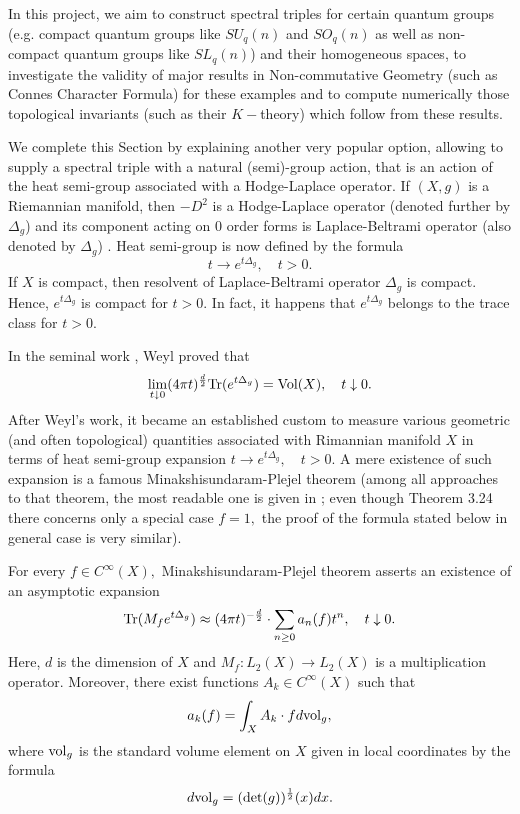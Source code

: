\documentclass{article}
\begin{document}
In this project, we aim to construct spectral triples for certain quantum groups (e.g. compact quantum groups like $SU_q(n)$ and $SO_q(n)$ as well as non-compact quantum groups like $SL_q(n)$) and their homogeneous spaces, to investigate the validity of major results in Non-commutative Geometry (such as Connes Character Formula) for these examples and to compute numerically those topological invariants (such as their $K-$theory) which follow from these results.

We complete this Section by explaining another very popular option, allowing to supply a spectral triple with a natural (semi)-group action, that is an action of the heat semi-group associated with a Hodge-Laplace operator. If $(X,g)$ is a Riemannian manifold, then $-D^2$ is a Hodge-Laplace operator (denoted further by $\Delta_g$) and its component acting on $0$ order forms is Laplace-Beltrami operator (also denoted by $\Delta_g$) \cite{Rosenberg}. Heat semi-group is now defined by the formula
$$t\to e^{t\Delta_g},\quad t>0.$$
If $X$ is compact, then resolvent of Laplace-Beltrami operator $\Delta_g$ is compact. Hence, $e^{t\Delta_g}$ is compact for $t>0.$ In fact, it happens that $e^{t\Delta_g}$ belongs to the trace class for $t>0.$

In the seminal work \cite{Weyl}, Weyl proved that
\begin{equation}\label{weyl formula}
\lim_{t\downarrow0}(4\pi t)^{\frac{d}{2}}{\rm Tr}(e^{t\Delta_g})={\rm Vol}(X),\quad t\downarrow0.
\end{equation}
After Weyl's work, it became an established custom to measure various geometric (and often topological) quantities associated with Rimannian manifold $X$ in terms of heat semi-group expansion $t\to e^{t\Delta_g},\quad t>0.$ A mere existence of such expansion is a famous Minakshisundaram-Plejel theorem (among all approaches to that theorem, the most readable one is given in \cite{Rosenberg}; even though Theorem 3.24 there concerns only a special case $f=1,$ the proof of the formula stated below in general case is very similar). 

For every $f\in C^{\infty}(X),$ Minakshisundaram-Plejel theorem asserts an existence of an asymptotic expansion 
\begin{equation}\label{heat asymptotic}
{\rm Tr}(M_fe^{t\Delta_g})\approx (4\pi t)^{-\frac{d}{2}}\cdot \sum_{n\geq0}a_n(f)t^n,\quad t\downarrow0.
\end{equation}
Here, $d$ is the dimension of $X$ and $M_f:L_2(X)\to L_2(X)$ is a multiplication operator. Moreover, there exist functions $A_k\in C^{\infty}(X)$ such that
\begin{equation}\label{normality of coefficients}
a_k(f)=\int_X A_k\cdot f d{\rm vol}_g,
\end{equation}
where ${\rm vol}_g$ is the standard volume element on $X$ given in local coordinates by the formula
$$d{\rm vol}_g=({\rm det}(g))^{\frac12}(x)dx.$$
\end{document}
